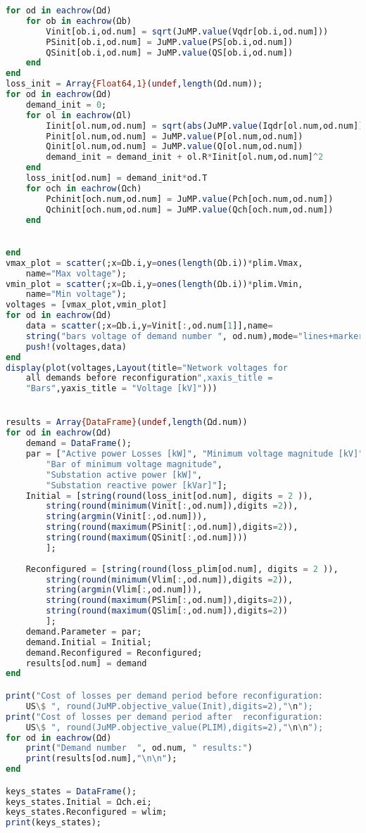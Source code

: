 \begin{lstlisting}[language = Julia, firstnumber = 208]
for od in eachrow(Ωd)
    for ob in eachrow(Ωb)
        Vinit[ob.i,od.num] = sqrt(JuMP.value(Vqdr[ob.i,od.num]))
        PSinit[ob.i,od.num] = JuMP.value(PS[ob.i,od.num])
        QSinit[ob.i,od.num] = JuMP.value(QS[ob.i,od.num])
    end
end
loss_init = Array{Float64,1}(undef,length(Ωd.num));
for od in eachrow(Ωd)
    demand_init = 0;
    for ol in eachrow(Ωl)
        Iinit[ol.num,od.num] = sqrt(abs(JuMP.value(Iqdr[ol.num,od.num])))
        Pinit[ol.num,od.num] = JuMP.value(P[ol.num,od.num])
        Qinit[ol.num,od.num] = JuMP.value(Q[ol.num,od.num])
        demand_init = demand_init + ol.R*Iinit[ol.num,od.num]^2
    end
    loss_init[od.num] = demand_init*od.T
    for och in eachrow(Ωch)
        Pchinit[och.num,od.num] = JuMP.value(Pch[och.num,od.num])
        Qchinit[och.num,od.num] = JuMP.value(Qch[och.num,od.num])
    end
    

end
vmax_plot = scatter(;x=Ωb.i,y=ones(length(Ωb.i))*plim.Vmax,
    name="Max voltage");
vmin_plot = scatter(;x=Ωb.i,y=ones(length(Ωb.i))*plim.Vmin,
    name="Min voltage");
voltages = [vmax_plot,vmin_plot]
for od in eachrow(Ωd)
    data = scatter(;x=Ωb.i,y=Vinit[:,od.num[1]],name=
    string("bars voltage of demand number ", od.num),mode="lines+markers")
    push!(voltages,data)
end
display(plot(voltages,Layout(title="Network voltages for 
    all demands before reconfiguration",xaxis_title = 
    "Bars",yaxis_title = "Voltage [kV]")))


results = Array{DataFrame}(undef,length(Ωd.num))
for od in eachrow(Ωd)
    demand = DataFrame();
    par = ["Active power Losses [kW]", "Minimum voltage magnitude [kV]", 
        "Bar of minimum voltage magnitude",
        "Substation active power [kW]", 
        "Substation reactive power [kVar]"];
    Initial = [string(round(loss_init[od.num], digits = 2 )), 
        string(round(minimum(Vinit[:,od.num]),digits =2)),
        string(argmin(Vinit[:,od.num])), 
        string(round(maximum(PSinit[:,od.num]),digits=2)), 
        string(round(maximum(QSinit[:,od.num])))  
        ];
    
    Reconfigured = [string(round(loss_plim[od.num], digits = 2 )), 
        string(round(minimum(Vlim[:,od.num]),digits =2)),
        string(argmin(Vlim[:,od.num])), 
        string(round(maximum(PSlim[:,od.num]),digits=2)), 
        string(round(maximum(QSlim[:,od.num]),digits=2))  
        ];
    demand.Parameter = par;
    demand.Initial = Initial;
    demand.Reconfigured = Reconfigured;
    results[od.num] = demand
end

print("Cost of losses per demand period before reconfiguration: 
    US\$ ", round(JuMP.objective_value(Init),digits=2),"\n");
print("Cost of losses per demand period after  reconfiguration: 
    US\$ ", round(JuMP.objective_value(PLIM),digits=2),"\n\n");
for od in eachrow(Ωd)
    print("Demand number  ", od.num, " results:")
    print(results[od.num],"\n\n");
end

keys_states = DataFrame();
keys_states.Initial = Ωch.ei;
keys_states.Reconfigured = wlim;
print(keys_states);
\end{lstlisting}